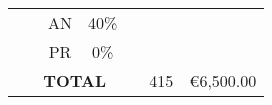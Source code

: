 \begin{table}[p]
\begin{center}
{\begin{tabular}{|c|l|c|c|l|l|l|}
\multicolumn{ 1}{|c|}{} & \multicolumn{ 1}{l|}{} & AN & 40\% & \multicolumn{ 1}{l|}{} & \multicolumn{ 1}{l|}{} & \multicolumn{ 1}{l|}{} \\ \cline{ 3- 4}
\multicolumn{ 1}{|c|}{} & \multicolumn{ 1}{l|}{} & PR & 0\% & \multicolumn{ 1}{l|}{} & \multicolumn{ 1}{l|}{} & \multicolumn{ 1}{l|}{} \\ \hline
\multicolumn{ 5}{|c|}{\textbf{TOTAL}} & \multicolumn{1}{c|}{415} & \multicolumn{1}{c|}{\textgreek{\euro}6,500.00} \\ \hline
\end{tabular}
}
\end{center}
\label{tab:plan}
\end{table}


